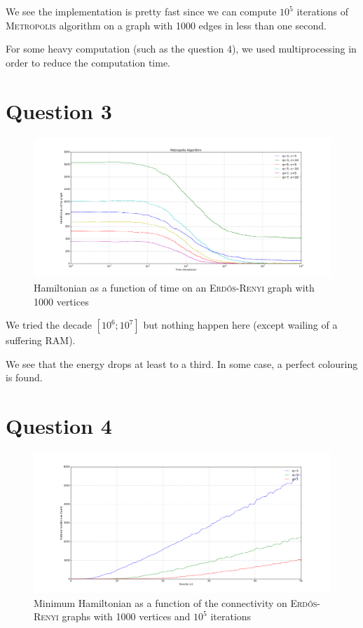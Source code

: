 \documentclass[a4paper, 11pt]{article}
\begin{document}
We see the implementation is pretty fast since we can compute $10^5$ iterations of \textsc{Metropolis} algorithm on a graph with 1000 edges in less than one second.

For some heavy computation (such as the question 4), we used multiprocessing in order to reduce the computation time.

\section{Question 3}

\begin{figure}[!ht]
    \centering
    \includegraphics[width=\textwidth]{figures/q3}
    \caption{Hamiltonian as a function of time on an \textsc{Erd\H{o}s-Renyi} graph with 1000 vertices}
\end{figure}

We tried the decade $[10^6; 10^7]$ but nothing happen here (except wailing of a suffering RAM).

We see that the energy drops at least to a third. In some case, a perfect colouring is found.

\FloatBarrier

\section{Question 4}

\begin{figure}[!ht]
    \centering
    \includegraphics[width=\textwidth]{figures/q4}
    \caption{Minimum Hamiltonian as a function of the connectivity on \textsc{Erd\H{o}s-Renyi} graphs with 1000 vertices and $10^5$ iterations}
\end{figure}
\end{document}
